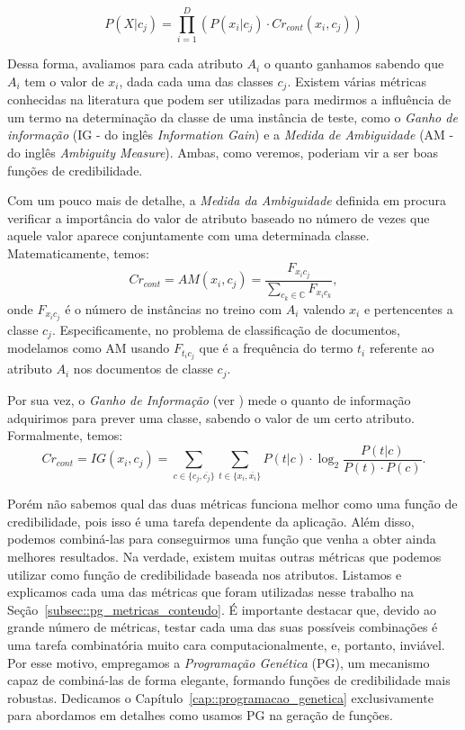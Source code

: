\begin{equation}\label{eqn::classindependence_conteudo}
   P(X|c_{j}) = \prod^{D}_{i=1}{(P(x_i|c_j) \cdot Cr_{cont}(x_i,c_j))} 
\end{equation}

Dessa forma, avaliamos para cada atributo $A_i$ o quanto ganhamos sabendo que $A_i$ tem o valor de $x_i$, dada cada uma das classes $c_j$. Existem várias métricas conhecidas na literatura que podem ser utilizadas para medirmos a influência de um termo na determinação da classe de uma instância de teste, como o \textit{Ganho de informação} (\textsc{IG} - do inglês \textit{Information Gain}) e a \textit{Medida de Ambiguidade} (\textsc{AM} - do inglês \textit{Ambiguity Measure}). Ambas, como veremos, poderiam vir a ser boas funções de credibilidade. 


    Com um pouco mais de detalhe, a \textit{Medida da Ambiguidade} definida em \cite{Mengle08} procura verificar a importância do valor de atributo baseado no número de vezes que aquele valor aparece conjuntamente com uma determinada classe. Matematicamente, temos:
\begin{equation}\label{eqn::classindependence_conteudo_am}
   Cr_{cont} = AM(x_i, c_j) = \frac{ F_{x_{i}c_{j}}}{\sum\limits_{c_k \in \mathbb{C}} F_{x_{i}c_{k}}},
\end{equation}
   onde $F_{x_{i}c_{j}}$ é o número de instâncias no treino com $A_i$ valendo $x_i$ e pertencentes a classe $c_j$. Especificamente, no problema de classificação de documentos, modelamos como \textsc{AM} usando $F_{t_{i}c_{j}}$ que é a frequência do termo $t_i$ referente ao atributo $A_i$ nos documentos de classe $c_j$.

    Por sua vez, o \textit{Ganho de Informação} (ver \cite{forman03}) mede o quanto de informação adquirimos para prever uma classe, sabendo o valor de um certo atributo. Formalmente, temos:
\begin{equation}\label{eqn::classindependence_conteudo_ig}
   Cr_{cont} = IG(x_i, c_j) = \sum_{c \in \{c_j, \overline{c_j}\}}\sum_{t \in \{x_i, \overline{x_i}\}}P(t|c) \cdot \log_2\frac{P(t|c)}{P(t) \cdot P(c)}.
\end{equation}

    Porém não sabemos qual das duas métricas funciona melhor como uma função de credibilidade, pois isso é uma tarefa dependente da aplicação. Além disso, podemos combiná-las para conseguirmos uma função que venha a obter ainda melhores resultados. Na verdade, existem muitas outras métricas que podemos utilizar como função de credibilidade baseada nos atributos. Listamos e explicamos cada uma das métricas que foram utilizadas nesse trabalho na Seção~\ref{subsec::pg_metricas_conteudo}. 
É importante destacar que, devido ao grande número de métricas, testar cada uma das suas possíveis combinações é uma tarefa combinatória muito cara computacionalmente, e, portanto, inviável. Por esse motivo, empregamos a \textit{Programação Genética} (\textsc{PG}), um mecanismo capaz de combiná-las de forma elegante, formando funções de credibilidade mais robustas. Dedicamos o Capítulo~\ref{cap::programacao_genetica} exclusivamente para abordamos em detalhes como usamos \textsc{PG} na geração de funções.

